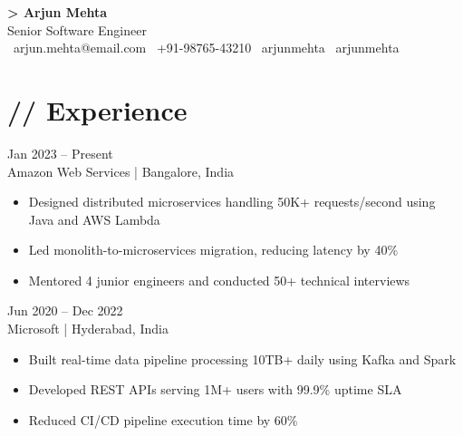 \documentclass[10pt,a4paper]{article}
\begin{document}
\begin{center}
{\fontsize{30pt}{34pt}\selectfont\ttfamily\bfseries\color{neongreen}> Arjun Mehta}\\[6pt]
{\large\color{dimtext}\ttfamily Senior Software Engineer}\\[8pt]
{\small\color{neonblue}%
\faEnvelope\ arjun.mehta@email.com \quad
\faPhone\ +91-98765-43210 \quad
\faLinkedin\ arjunmehta \quad
\faGithub\ arjunmehta}
\end{center}
\vspace{8pt}

\section{// Experience}

 \hfill {\ttfamily\small\color{dimtext}Jan 2023 -- Present}\\
{\color{neongreen}\ttfamily\small Amazon Web Services} {\color{dimtext}| Bangalore, India}
\begin{itemize}[leftmargin=1.2em, itemsep=0pt, topsep=3pt, label={\color{neonblue}$\rightarrow$}]
\item \small\color{lighttext} Designed distributed microservices handling 50K+ requests/second using Java and AWS Lambda
\item \small\color{lighttext} Led monolith-to-microservices migration, reducing latency by 40\%
\item \small\color{lighttext} Mentored 4 junior engineers and conducted 50+ technical interviews
\end{itemize}
\vspace{8pt}

 \hfill {\ttfamily\small\color{dimtext}Jun 2020 -- Dec 2022}\\
{\color{neongreen}\ttfamily\small Microsoft} {\color{dimtext}| Hyderabad, India}
\begin{itemize}[leftmargin=1.2em, itemsep=0pt, topsep=3pt, label={\color{neonblue}$\rightarrow$}]
\item \small\color{lighttext} Built real-time data pipeline processing 10TB+ daily using Kafka and Spark
\item \small\color{lighttext} Developed REST APIs serving 1M+ users with 99.9\% uptime SLA
\item \small\color{lighttext} Reduced CI/CD pipeline execution time by 60\%
\end{itemize}
\end{document}
